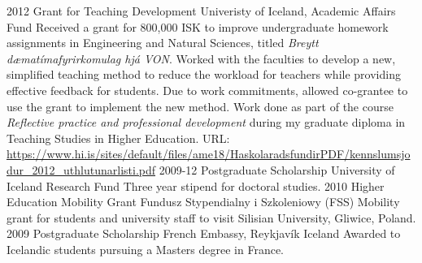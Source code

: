 \begin{entrylist}
\entry
{2012}
{Grant for Teaching Development}
{Univeristy of Iceland, Academic Affairs Fund}
{Received a grant for 800,000 ISK to improve undergraduate homework assignments in Engineering
and Natural Sciences, titled \emph{Breytt dæmatímafyrirkomulag hjá VON}. Worked with the
faculties to develop a new, simplified teaching method to reduce the workload for teachers while
providing effective feedback for students. Due to work commitments, allowed co-grantee to use the
grant to implement the new method. Work done as part of the course \textit{Reflective practice
and professional development} during my graduate diploma in Teaching Studies in Higher Education.
URL: \url{https://www.hi.is/sites/default/files/ame18/HaskolaradsfundirPDF/kennslumsjodur_2012_uthlutunarlisti.pdf}
}
\entry
{2009-12}
{Postgraduate Scholarship}
{University of Iceland Research Fund}
{Three year stipend for doctoral studies.}
\entry
{2010}
{Higher Education Mobility Grant}
{Fundusz Stypendialny i Szkoleniowy (FSS)} 
{Mobility grant for students and university staff to visit Silisian University, Gliwice, Poland.}
\entry
{2009}
{Postgraduate Scholarship}
{French Embassy, Reykjavík Iceland}
{Awarded to Icelandic students pursuing a Masters degree in France.}
\end{entrylist}
